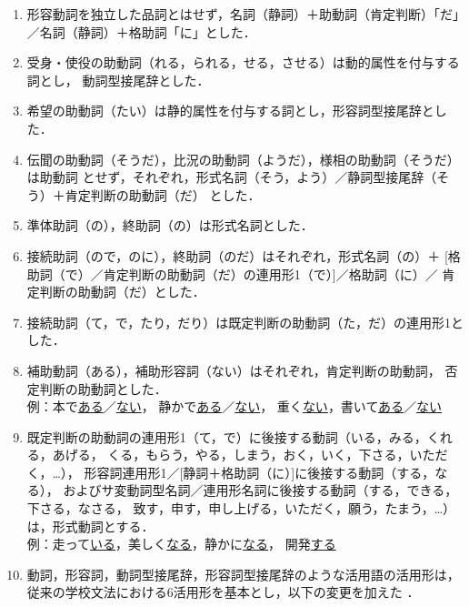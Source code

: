 \documentclass[japanese]{jnlp_1.2}
\begin{document}
\begin{enumerate}
\item 形容動詞を独立した品詞とはせず，名詞（静詞）＋助動詞（肯定判断）「だ」／名詞（静詞）＋格助詞「に」とした．

\item 受身・使役の助動詞（れる，られる，せる，させる）は動的属性を付与する詞とし，
動詞型接尾辞とした．

\item 希望の助動詞（たい）は静的属性を付与する詞とし，形容詞型接尾辞とした．

\item 伝聞の助動詞（そうだ），比況の助動詞（ようだ），様相の助動詞（そうだ）は助動詞
とせず，それぞれ，形式名詞（そう，よう）／静詞型接尾辞（そう）＋肯定判断の助動詞（だ）
とした．

\item 準体助詞（の），終助詞（の）は形式名詞とした．

\item 接続助詞（ので，のに），終助詞（のだ）はそれぞれ，形式名詞（の）＋
[格助詞（で）／肯定判断の助動詞（だ）の連用形1（で）]／格助詞（に）／
肯定判断の助動詞（だ）とした．

\item 接続助詞（て，で，たり，だり）は既定判断の助動詞（た，だ）の連用形1とした．

\item 補助動詞（ある），補助形容詞（ない）はそれぞれ，肯定判断の助動詞，
否定判断の助動詞とした．\\
例：本で\underline{ある}／\underline{ない}，
静かで\underline{ある}／\underline{ない}，
重く\underline{ない}，書いて\underline{ある}／\underline{ない}

\item 既定判断の助動詞の連用形1（て，で）に後接する動詞（いる，みる，くれる，あげる，
くる，もらう，やる，しまう，おく，いく，下さる，いただく，…），
形容詞連用形1／[静詞＋格助詞（に）]に後接する動詞（する，なる），
およびサ変動詞型名詞／連用形名詞に後接する動詞（する，できる，下さる，なさる，
致す，申す，申し上げる，いただく，願う，たまう，…）は，形式動詞とする．\\
例：走って\underline{いる}，美しく\underline{なる}，静かに\underline{なる}，
開発\underline{する}

\item 動詞，形容詞，動詞型接尾辞，形容詞型接尾辞のような活用語の活用形は，
従来の学校文法における6活用形を基本とし，以下の変更を加えた
\cite{宮崎他1995}
．


\end{enumerate}
\end{document}
